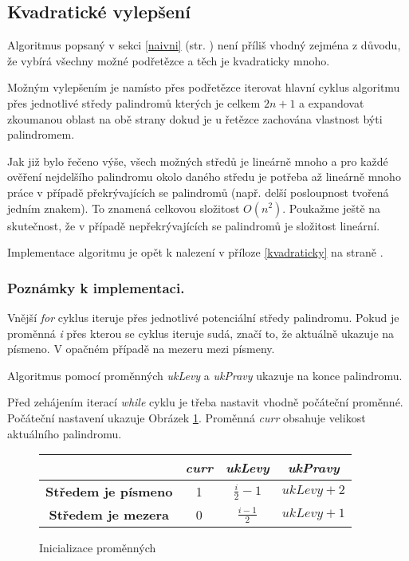 \documentclass[12pt,a4paper]{article}
\begin{document}
\subsection{Kvadratické vylepšení}

Algoritmus popsaný v sekci \ref{naivni} (str. \pageref{naivni}) není příliš vhodný zejména z důvodu, že vybírá všechny možné podřetězce a těch je kvadraticky mnoho.

Možným vylepšením je namísto přes podřetězce iterovat hlavní cyklus algoritmu přes jednotlivé středy palindromů kterých je celkem $2n+1$ a expandovat zkoumanou oblast na obě strany dokud je u řetězce zachována vlastnost býti palindromem.

Jak již bylo řečeno výše, všech možných středů je lineárně mnoho a pro každé ověření nejdelšího palindromu okolo daného středu je potřeba až lineárně mnoho práce v případě překrývajících se palindromů (např. delší posloupnost tvořená jedním znakem). To znamená celkovou složitost $O(n^2)$. Poukažme ještě na skutečnost, že v případě nepřekrývajících se palindromů je složitost lineární.

Implementace algoritmu je opět k nalezení v příloze \ref{kvadraticky} na straně \pageref{kvadraticky}.

\subsubsection{Poznámky k implementaci.} 

Vnější \emph{for} cyklus iteruje přes jednotlivé potenciální středy palindromu. Pokud je proměnná \emph{i} přes kterou se cyklus iteruje sudá, značí to, že aktuálně ukazuje na písmeno. V opačném případě na mezeru mezi písmeny.

Algoritmus pomocí proměnných \emph{ukLevy} a \emph{ukPravy} ukazuje na konce palindromu. 

Před zehájením iterací \emph{while} cyklu je třeba nastavit vhodně počáteční proměnné. Počáteční nastavení ukazuje Obrázek \ref{inicializace-promennych}. Proměnná \emph{curr} obsahuje velikost aktuálního palindromu.

\begin{figure}[h!]
\centering
\begin{tabular}{|c|c|c|c|}
\hline 
 & \emph{curr} & \emph{ukLevy} & \emph{ukPravy} \\ 
\hline 
\textbf{Středem je písmeno} & 1 & $\frac{i}{2} - 1$ & $ukLevy + 2$ \\ 
\hline 
\textbf{Středem je mezera} & 0 & $\frac{i-1}{2}$ & $ukLevy + 1$ \\ 
\hline 
\end{tabular}  
\caption{Inicializace proměnných}
\label{inicializace-promennych}
\end{figure}
\end{document}
